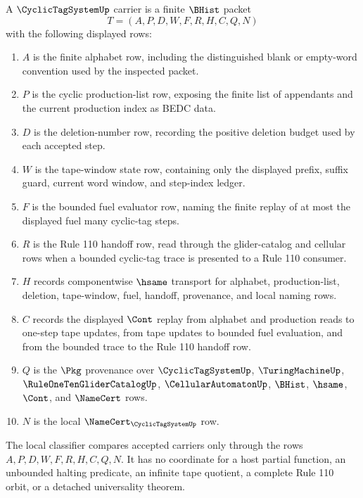 \begin{definition}
\label{def:cyclic-tag-system-carrier}
A $\CyclicTagSystemUp$ carrier is a finite $\BHist$ packet
$$
T=(A,P,D,W,F,R,H,C,Q,N)
$$
with the following displayed rows:
\begin{enumerate}
\item $A$ is the finite alphabet row, including the distinguished blank or empty-word convention used by the inspected packet.
\item $P$ is the cyclic production-list row, exposing the finite list of appendants and the current production index as BEDC data.
\item $D$ is the deletion-number row, recording the positive deletion budget used by each accepted step.
\item $W$ is the tape-window state row, containing only the displayed prefix, suffix guard, current word window, and step-index ledger.
\item $F$ is the bounded fuel evaluator row, naming the finite replay of at most the displayed fuel many cyclic-tag steps.
\item $R$ is the Rule 110 handoff row, read through the glider-catalog and cellular rows when a bounded cyclic-tag trace is presented to a Rule 110 consumer.
\item $H$ records componentwise $\hsame$ transport for alphabet, production-list, deletion, tape-window, fuel, handoff, provenance, and local naming rows.
\item $C$ records the displayed $\Cont$ replay from alphabet and production reads to one-step tape updates, from tape updates to bounded fuel evaluation, and from the bounded trace to the Rule 110 handoff row.
\item $Q$ is the $\Pkg$ provenance over $\CyclicTagSystemUp$, $\TuringMachineUp$, $\RuleOneTenGliderCatalogUp$, $\CellularAutomatonUp$, $\BHist$, $\hsame$, $\Cont$, and $\NameCert$ rows.
\item $N$ is the local $\NameCert_{\CyclicTagSystemUp}$ row.
\end{enumerate}
The local classifier compares accepted carriers only through the rows $A,P,D,W,F,R,H,C,Q,N$. It has no coordinate for a host partial function, an unbounded halting predicate, an infinite tape quotient, a complete Rule 110 orbit, or a detached universality theorem.
\end{definition}

